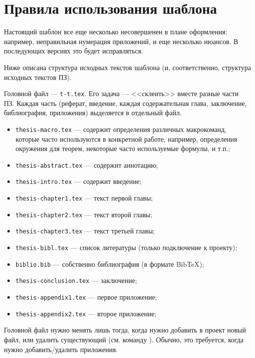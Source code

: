 ﻿\chapter{Правила использования шаблона}\label{app-manual}

Настоящий шаблон все еще несколько несовершенен в плане оформления: например, неправильная нумерация приложений, и еще несколько нюансов. В последующих версиях это будет исправляться.

Ниже описана структура исходных текстов шаблона (и, соответственно, структура исходных текстов ПЗ).

Головной файл --- \texttt{t-t.tex}. Его задача --- <<склеить>> вместе разные части ПЗ. Каждая часть (реферат, введение, каждая содержательная глава, заключение, библиография, приложения) выделяется в отдельный файл. 

\begin{itemize}
	\item[] \texttt{thesis-macro.tex} --- содержит определения различных макрокоманд, которые часто используются в конкретной работе, например, определения окружения для теорем, некоторые часто используемые формулы, и т.п.;
	\item[] \texttt{thesis-abstract.tex} --- содержит аннотацию;
	\item[] \texttt{thesis-intro.tex} --- содержит введение;
	\item[] \texttt{thesis-chapter1.tex} --- текст первой главы;
	\item[] \texttt{thesis-chapter2.tex} --- текст второй главы;
	\item[] \texttt{thesis-chapter3.tex} --- текст третьей главы;
	\item[] \texttt{thesis-bibl.tex} --- список литературы (только подключение к
	проекту);
	\item[] \texttt{biblio.bib} --- собственно библиография (в формате BibTeX);
	\item[] \texttt{thesis-conclusion.tex} --- заключение;
	\item[] \texttt{thesis-appendix1.tex} --- первое приложение;
	\item[] \texttt{thesis-appendix2.tex} --- второе приложение;
\end{itemize}



Головной файл нужно менять лишь тогда, когда нужно добавить в проект новый файл, или удалить существующий (см. команду \verb||). Обычно, это требуется, когда нужно добавить/удалить приложения.

